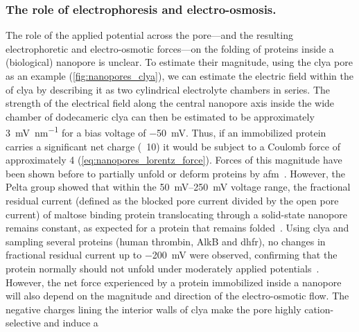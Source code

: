 \subsubsection{The role of electrophoresis and electro-osmosis.}
%

The role of the applied potential across the pore---and the resulting electrophoretic and electro-osmotic
forces---on the folding of proteins inside a (biological) nanopore is unclear. To estimate their magnitude,
using the \gls{clya} pore as an example (\cref{fig:nanopores_clya}), we can estimate the electric field within
the \lumen{} of \gls{clya} by describing it as two cylindrical electrolyte chambers in series. The strength of
the electrical field along the central nanopore axis inside the wide \cisi{} chamber of dodecameric \gls{clya}
can then be estimated to be approximately \SI{3}{\mV\per\nm} for a bias voltage of
\SI{-50}{\mV}.\footnotemark%
%
%
Thus, if an immobilized protein carries a significant net charge (\eg~\SI{10}{\ec}) it would be subject to a
Coulomb force of approximately \SI{4}{\pN} (\cref{eq:nanopores_lorentz_force}). Forces of this magnitude have
been shown before to partially unfold or deform proteins by \gls{afm}~\cite{Best-2001}. However, the Pelta
group showed that within the \SIrange{50}{250}{\mV} voltage range, the fractional residual current (defined as
the blocked pore current divided by the open pore current) of maltose binding protein translocating through a
solid-state nanopore remains constant, as expected for a protein that remains folded~\cite{Talaga-2009}. Using
\gls{clya} and sampling several proteins (human thrombin, {AlkB} and \gls{dhfr}), no changes in fractional
residual current up to \SI{-200}{\mV} were observed, confirming that the protein normally should not unfold
under moderately applied potentials~\cite{Soskine-2013}. However, the net force experienced by a protein
immobilized inside a nanopore will also depend on the magnitude and direction of the electro-osmotic flow. The
negative charges lining the interior walls of \gls{clya} make the pore highly cation-selective and induce a
